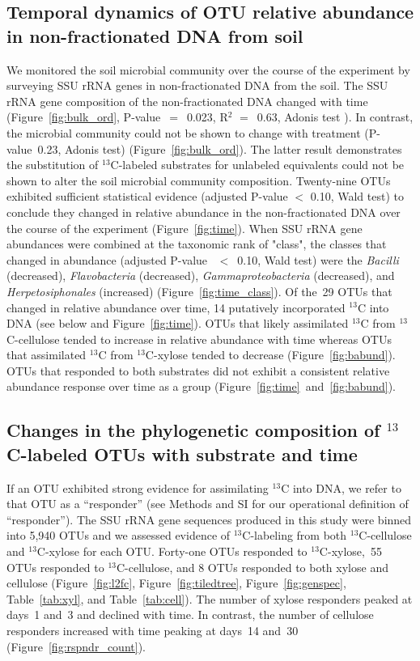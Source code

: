 \subsection{Temporal dynamics of OTU relative abundance in non-fractionated DNA from soil}
We monitored the soil microbial community over the course of the
experiment by surveying SSU rRNA genes in non-fractionated DNA from the
soil. The SSU rRNA gene composition of the non-fractionated DNA
changed with time (Figure~\ref{fig:bulk_ord}, P-value~$=$~0.023, R$^{2}$
$=$~0.63, Adonis test \citep{Anderson2001a}). In contrast, the microbial
community could not be shown to change with treatment
 (P-value~0.23, Adonis test) (Figure~\ref{fig:bulk_ord}). The latter
result demonstrates the substitution of $^{13}$C-labeled substrates for
unlabeled equivalents could not be shown to alter the soil microbial community
composition. Twenty-nine OTUs exhibited sufficient statistical evidence
(adjusted P-value $<$ 0.10, Wald test) to conclude they changed in relative
abundance in the non-fractionated DNA over the course of the experiment
(Figure~\ref{fig:time}). When SSU rRNA gene abundances were combined at the
taxonomic rank of "class", the classes that changed in abundance (adjusted
P-value~ $<$~0.10, Wald test) were the \textit{Bacilli} (decreased),
\textit{Flavobacteria} (decreased), \textit{Gammaproteobacteria} (decreased),
and \textit{Herpetosiphonales} (increased) (Figure~\ref{fig:time_class}). Of
the~29 OTUs that changed in relative abundance over time, 14 putatively
incorporated $^{13}$C into DNA (see below and Figure~\ref{fig:time}). OTUs that likely
assimilated $^{13}$C from $^{13}$C-cellulose tended to increase in
relative abundance with time whereas OTUs that assimilated $^{13}$C from
$^{13}$C-xylose tended to decrease (Figure~\ref{fig:babund}). OTUs that
responded to both substrates did not exhibit a consistent relative abundance
response over time as a group (Figure~\ref{fig:time}~and~\ref{fig:babund}).

\subsection{Changes in the phylogenetic composition of $^{13}$C-labeled OTUs with substrate and time}
If an OTU exhibited strong evidence for assimilating $^{13}$C into DNA, we
refer to that OTU as a ``responder'' (see Methods and SI for our operational
definition of ``responder''). The SSU rRNA gene sequences produced in this study
were binned into 5,940 OTUs and we assessed evidence of $^{13}$C-labeling from
both $^{13}$C-cellulose and $^{13}$C-xylose for each OTU. Forty-one OTUs
responded to $^{13}$C-xylose,~55 OTUs responded to $^{13}$C-cellulose, and
8 OTUs responded to both xylose and cellulose (Figure~\ref{fig:l2fc},
Figure~\ref{fig:tiledtree}, Figure~\ref{fig:genspec}, Table~\ref{tab:xyl}, and
Table~\ref{tab:cell}). The number of xylose responders peaked at days~1 and~3
and declined with time. In contrast, the number of cellulose responders
increased with time peaking at days~14 and~30 (Figure~\ref{fig:rspndr_count}). 

